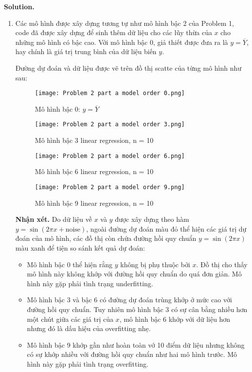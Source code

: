 \documentclass[a4paper, 12pt]{article}  %
\begin{document}
\textbf{Solution.} 
\begin{enumerate}[label=\alph*.]
    \item Các mô hình được xây dựng tương tự như mô hình bậc 2 của Problem 1, code đã được xây dựng để sinh thêm dữ liệu cho các lũy thừa của $x$ cho những mô hình có bậc cao. Với mô hình bậc 0, giả thiết được đưa ra là \(y = \overline Y \), hay chính là giá trị trung bình của dữ liệu biến $y$.
    
    Đường dự đoán và dữ liệu được vẽ trên đồ thị scatte của từng mô hình như sau:
    
    \begin{figure}[H]
        \centering
        \texttt{[image: Problem 2 part a model order 0.png]}
        \caption{Mô hình bậc 0: $y = \overline Y$}
        \label{fig:Data1}
        
        \texttt{[image: Problem 2 part a model order 3.png]}
        \caption{Mô hình bậc 3 linear regression, n = 10}
        \label{fig:Data2}
    \end{figure}
    \begin{figure}[H]
        \centering
        \texttt{[image: Problem 2 part a model order 6.png]}
        \caption{Mô hình bậc 6 linear regression, n = 10}
        \label{fig:Data3}
    \end{figure}
    
    \begin{figure}[H]
        \centering
        \texttt{[image: Problem 2 part a model order 9.png]}
        \caption{Mô hình bậc 9 linear regression, n = 10}
        \label{fig:Data4}
    \end{figure}
    
    \textbf{Nhận xét.} Do dữ liệu về $x$ và $y$ được xây dựng theo hàm \(y = \sin (2 \pi x + \text{noise})\), ngoài đường dự đoán màu đỏ thể hiện các giá trị dự đoán của mô hình, các đồ thị còn chứa đường hồi quy chuẩn \(y = \sin (2 \pi x)\) màu xanh để tiện so sánh kết quả dự đoán:
    \begin{itemize}
        \item Mô hình bậc 0 thể hiện rằng $y$ không bị phụ thuộc bởi $x$. Đồ thị cho thấy mô hình này không khớp với đường hồi quy chuẩn do quá đơn giản. Mô hình này gặp phải tình trạng underfitting.
        \item Mô hình bậc 3 và bậc 6 có đường dự đoán trùng khớp ở mức cao với đường hồi quy chuẩn. Tuy nhiên mô hình bậc 3 có sự cân bằng nhiều hơn một chút giữa các giá trị của $x$, mô hình bậc 6 khớp với dữ liệu hơn nhưng đó là dấu hiệu của overfitting nhẹ.
        \item Mô hình bậc 9 khớp gần như hoàn toàn vớ 10 điểm dữ liệu nhưng không có sự khớp nhiều với đường hồi quy chuẩn như hai mô hình trước. Mô hình này gặp phải tình trạng overfitting.
    \end{itemize}
    

\end{enumerate}
\end{document}
